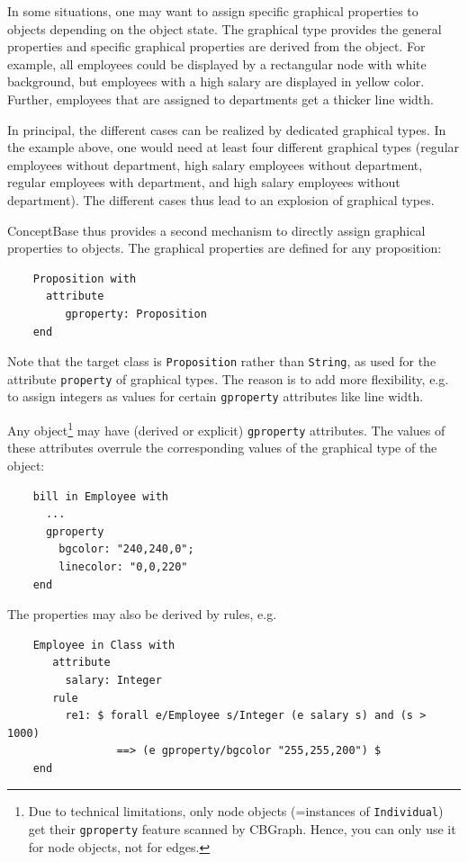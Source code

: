 In some situations, one may want to assign specific graphical properties to objects depending on
the object state. The graphical type provides the general properties and specific graphical properties
are derived from the object. For example, all employees could be displayed by a rectangular node with
white background, but employees with a high salary are displayed in yellow color. Further,
employees that are assigned to departments get a thicker line width. 

In principal, the different cases can be realized by dedicated graphical types. In the example above,
one would need at least four different graphical types (regular employees without department,
high salary employees without department, regular employees with department, and
high salary employees without department). The different cases thus lead to an explosion of graphical
types.

ConceptBase thus provides a second mechanism to directly assign graphical properties to objects.
The graphical properties are defined for any proposition:

{\small
\begin{verbatim}
    Proposition with
      attribute 
         gproperty: Proposition
    end
\end{verbatim}
}

Note that the target class is {\tt Proposition} rather than {\tt String}, as used for 
the attribute {\tt property} of graphical types. The reason is to add more flexibility,
e.g. to assign integers as values for certain {\tt gproperty} attributes like line width.


Any object\footnote{Due to technical limitations, only node objects (=instances of {\tt Individual}) get their {\tt gproperty} feature
scanned by CBGraph. Hence, you can only use it for node objects, not for edges.}%
may have (derived or explicit) {\tt gproperty} attributes. The values of these attributes 
overrule the corresponding values of the graphical type of the object:

{\small
\begin{verbatim}
    bill in Employee with
      ...
      gproperty
        bgcolor: "240,240,0";
        linecolor: "0,0,220"
    end
\end{verbatim}
}

The properties may also be derived by rules, e.g.\ 

{\small
\begin{verbatim}
    Employee in Class with
       attribute
         salary: Integer
       rule
         re1: $ forall e/Employee s/Integer (e salary s) and (s > 1000) 
                 ==> (e gproperty/bgcolor "255,255,200") $
    end
\end{verbatim}
}


